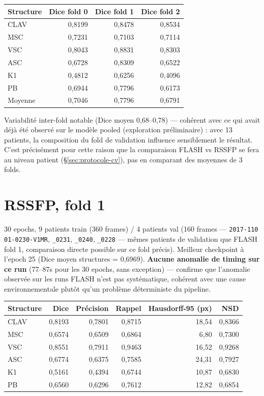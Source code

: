 \documentclass[11pt,a4paper]{report}
\begin{document}
\begin{center}
\begin{tabular}{lrrr}
\toprule
Structure & Dice fold 0 & Dice fold 1 & Dice fold 2 \\
\midrule
CLAV & 0,8199 & 0,8478 & 0,8534 \\
MSC  & 0,7231 & 0,7103 & 0,7114 \\
VSC  & 0,8043 & 0,8831 & 0,8303 \\
ASC  & 0,6728 & 0,8309 & 0,6522 \\
K1   & 0,4812 & 0,6256 & 0,4096 \\
PB   & 0,6944 & 0,7796 & 0,6173 \\
\midrule
Moyenne & 0,7046 & 0,7796 & 0,6791 \\
\bottomrule
\end{tabular}
\end{center}

Variabilité inter-fold notable (Dice moyen 0,68--0,78) --- cohérent avec ce qui avait
déjà été observé sur le modèle pooled (exploration préliminaire) : avec 13 patients,
la composition du fold de validation influence sensiblement le résultat. C'est
précisément pour cette raison que la comparaison FLASH vs RSSFP se fera au niveau
patient (\S\ref{sec:protocole-cv}), pas en comparant des moyennes de 3 folds.

\section{RSSFP, fold 1}

30 epochs, 9 patients train (360 frames) / 4 patients val (160 frames ---
\texttt{2017-110 01-0230-V1MR}, \texttt{\_0231}, \texttt{\_0240}, \texttt{\_0228} ---
mêmes patients de validation que FLASH fold 1, comparaison directe possible sur ce
fold précis). Meilleur checkpoint à l'epoch 25 (Dice moyen structures = 0,6969).
\textbf{Aucune anomalie de timing sur ce run} (77--87s pour les 30 epochs, sans
exception) --- confirme que l'anomalie observée sur les runs FLASH n'est pas
systématique, cohérent avec une cause environnementale plutôt qu'un problème
déterministe du pipeline.

\begin{center}
\begin{tabular}{lrrrrr}
\toprule
Structure & Dice & Précision & Rappel & Hausdorff-95 (px) & NSD \\
\midrule
CLAV & 0,8193 & 0,7801 & 0,8715 & 18,54 & 0,8366 \\
MSC  & 0,6574 & 0,6509 & 0,6864 & 6,80 & 0,7300 \\
VSC  & 0,8551 & 0,7911 & 0,9463 & 16,52 & 0,9268 \\
ASC  & 0,6774 & 0,6375 & 0,7585 & 24,31 & 0,7927 \\
K1   & 0,5161 & 0,4394 & 0,6744 & 10,87 & 0,6830 \\
PB   & 0,6560 & 0,6296 & 0,7612 & 12,82 & 0,6854 \\
\bottomrule
\end{tabular}
\end{center}
\end{document}
